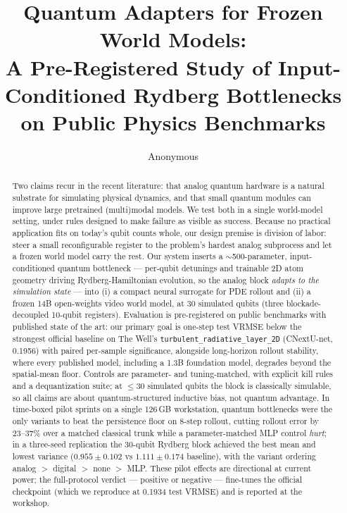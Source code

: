 \documentclass{article}
\title{Quantum Adapters for Frozen World Models:\\
A Pre-Registered Study of Input-Conditioned Rydberg Bottlenecks\\
on Public Physics Benchmarks}
\author{Anonymous}
\begin{document}
\maketitle

\begin{abstract}
Two claims recur in the recent literature: that analog quantum hardware is a
natural substrate for simulating physical dynamics, and that small quantum
modules can improve large pretrained (multi)modal models. We test both in a
single world-model setting, under rules designed to make failure as visible as
success. Because no practical application fits on today's qubit counts whole,
our design premise is division of labor: steer a small reconfigurable register
to the problem's hardest analog subprocess and let a frozen world model carry
the rest. Our system inserts a $\sim$500-parameter, input-conditioned
quantum bottleneck --- per-qubit detunings and trainable 2D atom geometry
driving Rydberg-Hamiltonian evolution, so the analog block \emph{adapts to the
simulation state} --- into (i) a compact neural surrogate for PDE rollout and
(ii) a frozen 14B open-weights video world model, at 30 simulated qubits
(three blockade-decoupled 10-qubit registers). Evaluation is pre-registered on
public benchmarks with published state of the art: our primary goal is
one-step test VRMSE below the strongest official baseline on The Well's
\texttt{turbulent\_radiative\_layer\_2D} (CNextU-net, 0.1956) with paired
per-sample significance, alongside long-horizon rollout stability, where every
published model, including a 1.3B foundation model, degrades beyond the
spatial-mean floor. Controls are parameter- and tuning-matched, with explicit
kill rules and a dequantization suite; at $\leq$30 simulated qubits the block
is classically simulable, so all claims are about quantum-structured inductive
bias, not quantum advantage. In time-boxed pilot sprints on a single 126\,GB
workstation, quantum bottlenecks were the only variants to beat the
persistence floor on 8-step rollout, cutting rollout error by 23--37\% over a
matched classical trunk while a parameter-matched MLP control \emph{hurt}; in
a three-seed replication the 30-qubit Rydberg block achieved the best mean and
lowest variance ($0.955 \pm 0.102$ vs $1.111 \pm 0.174$ baseline), with the
variant ordering analog $>$ digital $>$ none $>$ MLP. These pilot effects are
directional at current power; the full-protocol verdict --- positive or
negative --- fine-tunes the official checkpoint (which we reproduce at 0.1934
test VRMSE) and is reported at the workshop.
\end{abstract}
\end{document}
